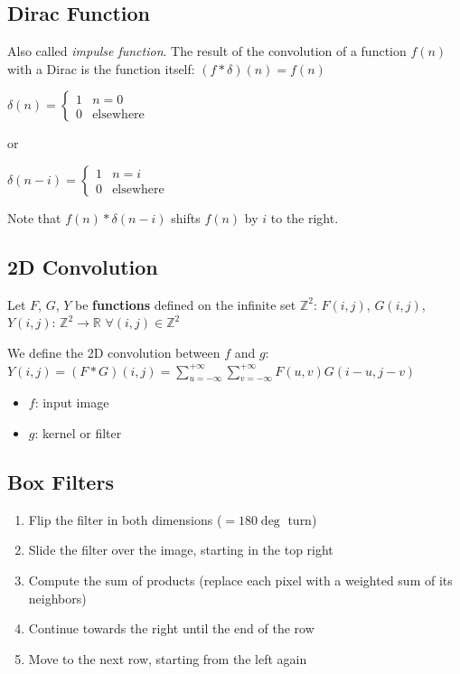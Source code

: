 \subsection{Dirac Function}
Also called \textit{impulse function}. The result of the convolution of a function $f(n)$ with a Dirac is the function itself: $(f * \delta)(n) = f(n)$

$\delta(n) = \begin{cases}
  1 & n = 0 \\
  0 & \text{elsewhere}
\end{cases}$

or

$\delta(n - i) = \begin{cases}
  1 & n = i \\
  0 & \text{elsewhere}
\end{cases}$

Note that $f(n) * \delta(n - i)$ shifts $f(n)$ by $i$ to the right.

\subsection{2D Convolution}
Let $F$, $G$, $Y$ be \textbf{functions} defined on the infinite set $\mathbb{Z}^{2}$: $F(i,j)$, $G(i,j)$, $Y(i,j)$: $\mathbb{Z}^{2} \to \mathbb{R}$ \quad $\forall(i,j) \in \mathbb{Z}^{2}$

We define the 2D convolution between $f$ and $g$: $Y(i,j) = (F * G)(i,j) = \sum_{u = -\infty}^{+\infty} \sum_{v = -\infty}^{+\infty} F(u,v) G(i-u, j-v)$

\begin{itemize}
  \item $f$: input image
  \item $g$: kernel or filter
\end{itemize}

\subsection{Box Filters}

\begin{enumerate}
  \item Flip the filter in both dimensions ($= 180 \deg$ turn)
  \item Slide the filter over the image, starting in the top right
  \item Compute the sum of products (replace each pixel with a weighted sum of its neighbors)
  \item Continue towards the right until the end of the row
  \item Move to the next row, starting from the left again
\end{enumerate}

